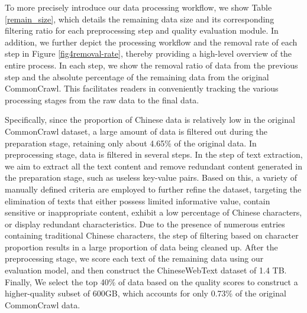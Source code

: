 \documentclass{article}
\begin{document}

To more precisely introduce our data processing workflow, we show Table \ref{remain_size}, which details the remaining data size and its corresponding filtering ratio for each preprocessing step and quality evaluation module. In addition, we further depict the processing workflow and the removal rate of each step in Figure \ref{fig4removal-rate}, thereby providing a high-level overview of the entire process. In each step, we show the removal ratio of data from the previous step and the absolute percentage of the remaining data from the original CommonCrawl. This facilitates readers in conveniently tracking the various processing stages from the raw data to the final data. 

Specifically, since the proportion of Chinese data is relatively low in the original CommonCrawl dataset, a large amount of data is filtered out during the preparation stage, retaining only about 4.65\% of the original data. In preprocessing stage, data is filtered in several steps. In the step of text extraction, we aim to extract all the text content and remove  redundant content generated in the preparation stage, such as useless key-value pairs. Based on this, a variety of manually defined criteria are employed to further refine the dataset, targeting the elimination of texts that either possess limited informative value, contain sensitive or inappropriate content, exhibit a low percentage of Chinese characters, or display redundant characteristics. Due to the presence of numerous entries containing traditional Chinese characters, the step of filtering based on character proportion results in a large proportion of data being cleaned up. After the preprocessing stage, we score each text of the remaining data using our evaluation model, and then construct the ChineseWebText dataset of 1.4 TB. Finally, We select the top 40\% of data based on the quality scores to construct a higher-quality subset of 600GB, which accounts for only 0.73\% of the original CommonCrawl data.
\end{document}
